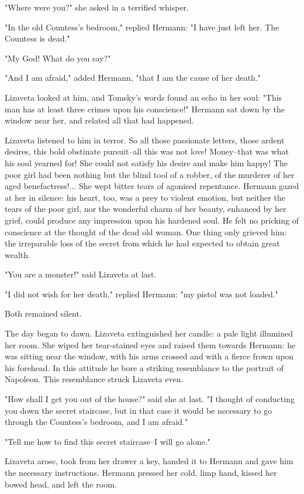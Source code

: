 "Where were you?" she asked in a terrified whisper.

"In the old Countess's bedroom," replied Hermann: "I have just left
her. The Countess is dead."

"My God! What do you say?"

"And I am afraid," added Hermann, "that I am the cause of her death."

Lizaveta looked at him, and Tomsky's words found an echo in her soul:
"This man has at least three crimes upon his conscience!" Hermann sat
down by the window near her, and related all that had happened.

Lizaveta listened to him in terror. So all those passionate letters,
those ardent desires, this bold obstinate pursuit--all this was not
love! Money--that was what his soul yearned for! She could not satisfy
his desire and make him happy! The poor girl had been nothing but
the blind tool of a robber, of the murderer of her aged
benefactress!... She wept bitter tears of agonised repentance. Hermann
gazed at her in silence: his heart, too, was a prey to violent
emotion, but neither the tears of the poor girl, nor the wonderful
charm of her beauty, enhanced by her grief, could produce any
impression upon his hardened soul. He felt no pricking of conscience
at the thought of the dead old woman. One thing only grieved him: the
irreparable loss of the secret from which he had expected to obtain
great wealth.

"You are a monster!" said Lizaveta at last.

"I did not wish for her death," replied Hermann: "my pistol was not
loaded."

Both remained silent.

The day began to dawn. Lizaveta extinguished her candle: a pale light
illumined her room. She wiped her tear-stained eyes and raised them
towards Hermann: he was sitting near the window, with his arms crossed
and with a fierce frown upon his forehead. In this attitude he bore a
striking resemblance to the portrait of Napoleon. This resemblance
struck Lizaveta even.

"How shall I get you out of the house?" said she at last. "I thought
of conducting you down the secret staircase, but in that case it would
be necessary to go through the Countess's bedroom, and I am afraid."

"Tell me how to find this secret staircase--I will go alone."

Lizaveta arose, took from her drawer a key, handed it to Hermann and
gave him the necessary instructions. Hermann pressed her cold, limp
hand, kissed her bowed head, and left the room.

